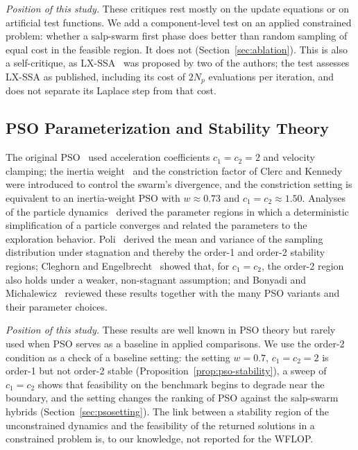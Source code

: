 \emph{Position of this study.} These critiques rest mostly on the update equations or on artificial test functions. We add a component-level test on an applied constrained problem: whether a salp-swarm first phase does better than random sampling of equal cost in the feasible region. It does not (Section~\ref{sec:ablation}). This is also a self-critique, as LX-SSA~\cite{Solanki2023} was proposed by two of the authors; the test assesses LX-SSA as published, including its cost of $2N_p$ evaluations per iteration, and does not separate its Laplace step from that cost.

\subsection{PSO Parameterization and Stability Theory}
\label{sec:related-pso}
The original PSO~\cite{Kennedy1995} used acceleration coefficients $c_1=c_2=2$ and velocity clamping; the inertia weight~\cite{Shi1998} and the constriction factor of Clerc and Kennedy~\cite{Clerc2002} were introduced to control the swarm's divergence, and the constriction setting is equivalent to an inertia-weight PSO with $w\approx0.73$ and $c_1=c_2\approx1.50$. Analyses of the particle dynamics~\cite{Trelea2003,VandenBergh2006} derived the parameter regions in which a deterministic simplification of a particle converges and related the parameters to the exploration behavior. Poli~\cite{Poli2009} derived the mean and variance of the sampling distribution under stagnation and thereby the order-1 and order-2 stability regions; Cleghorn and Engelbrecht~\cite{Cleghorn2018} showed that, for $c_1=c_2$, the order-2 region also holds under a weaker, non-stagnant assumption; and Bonyadi and Michalewicz~\cite{Bonyadi2017} reviewed these results together with the many PSO variants and their parameter choices.

\emph{Position of this study.} These results are well known in PSO theory but rarely used when PSO serves as a baseline in applied comparisons. We use the order-2 condition as a check of a baseline setting: the setting $w=0.7$, $c_1=c_2=2$ is order-1 but not order-2 stable (Proposition~\ref{prop:pso-stability}), a sweep of $c_1=c_2$ shows that feasibility on the benchmark begins to degrade near the boundary, and the setting changes the ranking of PSO against the salp-swarm hybrids (Section~\ref{sec:psosetting}). The link between a stability region of the unconstrained dynamics and the feasibility of the returned solutions in a constrained problem is, to our knowledge, not reported for the WFLOP.

